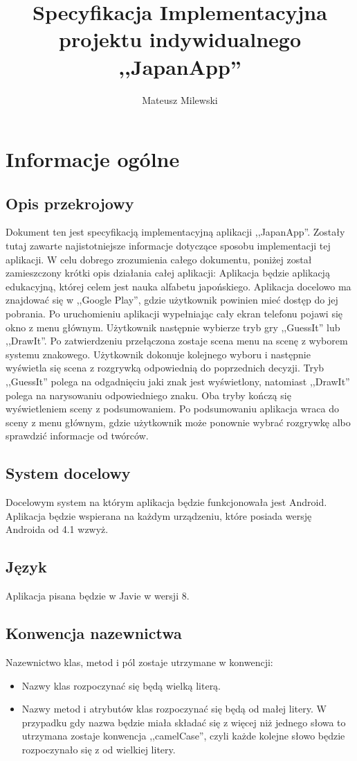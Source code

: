 \documentclass[15pt]{article}
\author{Mateusz Milewski}
\title{\textbf{Specyfikacja Implementacyjna projektu indywidualnego ,,JapanApp''}}
\begin{document}
  \maketitle
  \tableofcontents
  \clearpage
  \section{Informacje ogólne}
  \subsection{Opis przekrojowy}
  Dokument ten jest specyfikacją implementacyjną aplikacji ,,JapanApp''. Zostały tutaj zawarte najistotniejsze informacje dotyczące sposobu implementacji tej aplikacji. W celu dobrego zrozumienia całego dokumentu, poniżej został zamieszczony krótki opis działania całej aplikacji:
  \newline
  \newline
  Aplikacja będzie aplikacją edukacyjną, której celem jest nauka alfabetu japońskiego. Aplikacja docelowo ma znajdować się w ,,Google Play'', gdzie użytkownik powinien mieć dostęp do jej pobrania. Po uruchomieniu aplikacji wypełniając cały ekran telefonu pojawi się okno z menu głównym. Użytkownik następnie wybierze tryb gry ,,GuessIt'' lub ,,DrawIt''. Po zatwierdzeniu przełączona zostaje scena menu na scenę z wyborem systemu znakowego. Użytkownik dokonuje kolejnego wyboru i następnie wyświetla się scena z rozgrywką odpowiednią do poprzednich decyzji. Tryb ,,GuessIt'' polega na odgadnięciu jaki znak jest wyświetlony, natomiast ,,DrawIt'' polega na narysowaniu odpowiedniego znaku. Oba tryby kończą się wyświetleniem sceny z podsumowaniem. Po podsumowaniu aplikacja wraca do sceny z menu głównym, gdzie użytkownik może ponownie wybrać rozgrywkę albo sprawdzić informacje od twórców.
  
  \subsection{System docelowy}
  Docelowym system na którym aplikacja będzie funkcjonowała jest Android. Aplikacja będzie wspierana na każdym urządzeniu, które posiada wersję Androida od 4.1 wzwyż. 
  \subsection{Język}
  Aplikacja pisana będzie w Javie w wersji 8.
  \subsection{Konwencja nazewnictwa} 
  Nazewnictwo klas, metod i pól zostaje utrzymane w konwencji:
  \begin{itemize}
    \item Nazwy klas rozpoczynać się będą wielką literą.
    \item Nazwy metod i atrybutów klas rozpoczynać się będą od małej litery. W przypadku gdy nazwa będzie miała składać się z więcej niż jednego słowa to utrzymana zostaje konwencja ,,camelCase'', czyli każde kolejne słowo będzie rozpoczynało się z od wielkiej litery.
  \end{itemize}
  
\end{document}

